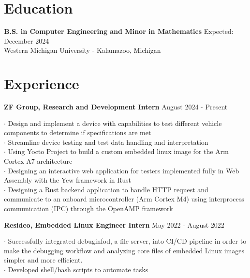\documentclass[letter,12pt]{article}
\begin{document}
\vspace{-0.50cm}
\section*{Education} 
\vspace{-.25cm}
\textbf{B.S. in Computer Engineering and Minor in Mathematics} 
\hfill Expected: December 2024\\
Western Michigan University - Kalamazoo, Michigan\\ 

\vspace{-1.0cm}
\section*{Experience} 
\begin{tcolorbox}
[colback=gray!25,
  leftrule=0pt,
  rightrule=0pt,
  sharp corners]
\textbf{ZF Group, Research and Development Intern} \hfill August 2024 - Present 
\end{tcolorbox}
\noindent$\cdot$ Design and implement a device with capabilities to test different vehicle components to determine if specifications are met\\
$\cdot$ Streamline device testing and test data handling and interpretation\\
$\cdot$ Using Yocto Project to build a custom embedded linux image for the Arm Cortex-A7 architecture \\
$\cdot$ Designing an interactive web application for testers implemented fully in Web Assembly with the Yew framework in Rust \\
$\cdot$ Designing a Rust backend application to handle HTTP request and communicate to an onboard microcontroller (Arm Cortex M4)
using interprocess communication (IPC) through the OpenAMP framework\\
\vspace{-.5cm}
\begin{tcolorbox}
[colback=gray!25,
  leftrule=0pt,
  rightrule=0pt,
  sharp corners]
\noindent\textbf{Resideo, Embedded Linux
Engineer Intern} \hfill May 2022 - August 2022 
\end{tcolorbox}
\noindent$\cdot$ Successfully integrated
debuginfod, a file server, into CI/CD pipeline in order to make the debugging
workflow and analyzing core files of embedded Linux images simpler and more
efficient.\\
$\cdot$ Developed shell/bash scripts to automate tasks\\
\end{document}
